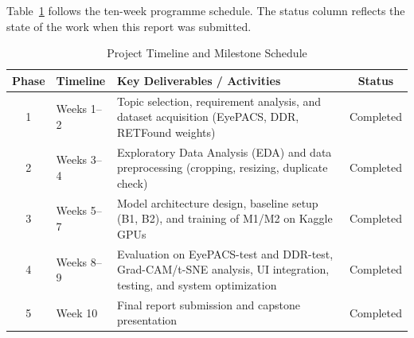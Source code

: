 Table~\ref{tab:milestones} follows the ten-week programme schedule. The status column reflects the state of the work when this report was submitted.

\begin{table}[htbp]
    \centering
    \caption{Project Timeline and Milestone Schedule}
    \label{tab:milestones}
    \begin{tabularx}{\textwidth}{c l X c}
        \toprule
        \textbf{Phase} & \textbf{Timeline} & \textbf{Key Deliverables / Activities} & \textbf{Status} \\
        \midrule
        1 & Weeks 1--2 & Topic selection, requirement analysis, and dataset acquisition (EyePACS, DDR, RETFound weights) & Completed \\
        2 & Weeks 3--4 & Exploratory Data Analysis (EDA) and data preprocessing (cropping, resizing, duplicate check) & Completed \\
        3 & Weeks 5--7 & Model architecture design, baseline setup (B1, B2), and training of M1/M2 on Kaggle GPUs & Completed \\
        4 & Weeks 8--9 & Evaluation on EyePACS-test and DDR-test, Grad-CAM/t-SNE analysis, UI integration, testing, and system optimization & Completed \\
        5 & Week 10    & Final report submission and capstone presentation & Completed \\
        \bottomrule
    \end{tabularx}
\end{table}
